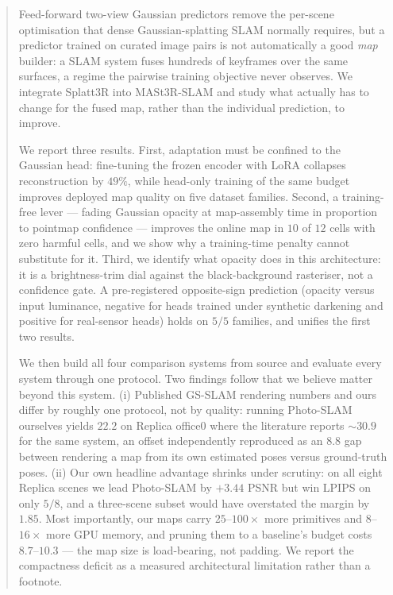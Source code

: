 \begin{abstract}
Feed-forward two-view Gaussian predictors remove the per-scene optimisation
that dense Gaussian-splatting SLAM normally requires, but a predictor trained
on curated image pairs is not automatically a good \emph{map} builder: a SLAM
system fuses hundreds of keyframes over the same surfaces, a regime the
pairwise training objective never observes. We integrate Splatt3R into
MASt3R-SLAM and study what actually has to change for the fused map, rather
than the individual prediction, to improve.

We report three results. First, adaptation must be confined to the Gaussian
head: fine-tuning the frozen encoder with LoRA collapses reconstruction by
$49\%$, while head-only training of the same budget improves deployed map
quality on five dataset families. Second, a training-free lever --- fading
Gaussian opacity at map-assembly time in proportion to pointmap confidence ---
improves the online map in $10$ of $12$ cells with zero harmful cells, and we
show why a training-time penalty cannot substitute for it. Third, we identify
what opacity does in this architecture: it is a brightness-trim dial against
the black-background rasteriser, not a confidence gate. A pre-registered
opposite-sign prediction (opacity versus input luminance, negative for heads
trained under synthetic darkening and positive for real-sensor heads) holds on
$5/5$ families, and unifies the first two results.

We then build all four comparison systems from source and evaluate every
system through one protocol. Two findings follow that we believe matter beyond
this system. (i) Published GS-SLAM rendering numbers and ours differ by
roughly one protocol, not by quality: running Photo-SLAM ourselves yields
$22.2$\dB{} on Replica office0 where the literature reports ${\sim}30.9$\dB{}
for the same system, an offset independently reproduced as an $8.8$\dB{} gap
between rendering a map from its own estimated poses versus ground-truth
poses. (ii) Our own headline advantage shrinks under scrutiny: on all eight
Replica scenes we lead Photo-SLAM by $+3.44$\dB{} PSNR but win LPIPS on only
$5/8$, and a three-scene subset would have overstated the margin by
$1.85$\dB{}. Most importantly, our maps carry $25$--$100\times$ more
primitives and $8$--$16\times$ more GPU memory, and pruning them to a
baseline's budget costs $8.7$--$10.3$\dB{} --- the map size is load-bearing,
not padding. We report the compactness deficit as a measured architectural
limitation rather than a footnote.
\end{abstract}
